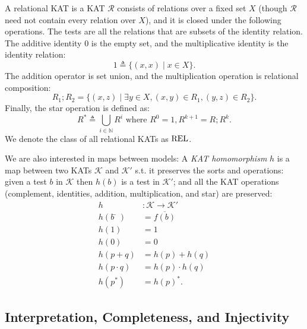 \begin{definition}
  A relational KAT is a KAT $\mathcal{R}$ consists of relations over a fixed set \(X\) 
  (though $\mathcal{R}$ need not contain every relation over $X$),
  and it is closed under the following operations. 
  The tests are all the relations that are subsets of the identity relation.  
  The additive identity 0 is the empty set, and
  the multiplicative identity is the identity relation:
  \[1  \triangleq  \{(x, x)  \mid  x  \in  X\}.\] The addition operator is set union, and the
  multiplication operation is relational composition:
  \[R_{1} ; R_{2} = \{(x, z)  \mid   \exists  y  \in  X, (x, y)  \in  R_{1}, (y, z)  \in  R_{2}\}.\] 
  Finally, the star operation is defined as:
  \[R^*  \triangleq   \bigcup _{i  \in  \mathbb{N}} R^i \text{ where } R^0 = 1, R^{k+1} = R ; R^k.\] We denote the
  class of all relational KATs as \(\mathbf{\mathrm{REL}}\).
\end{definition}

We are also interested in maps between models:
A \emph{KAT homomorphism} \(h\) is a map between two KATs \(\mathcal{K}\) and \(\mathcal{K}'\)
s.t. it preserves the sorts and operations:
given a test \(b\) in \(\mathcal{K}\) then \(h(b)\) is a test in \(\mathcal{K}'\);
and all the KAT operations (complement, identities, addition, multiplication, and star) are preserved:
\begin{align*}
    h & : 𝒦  →  𝒦'\\
    h(b̄) & = \overline{f(b)} \\  
    h(1) & = 1 \\  
    h(0) & = 0 \\
    h(p + q) & = h(p) + h(q) \\  
    h(p ⋅ q) & = h(p) ⋅ h(q) \\  
    h(p^*) & = h(p)^*.
\end{align*}

\subsection{Interpretation, Completeness, and Injectivity}\label{sec: completeness background}

